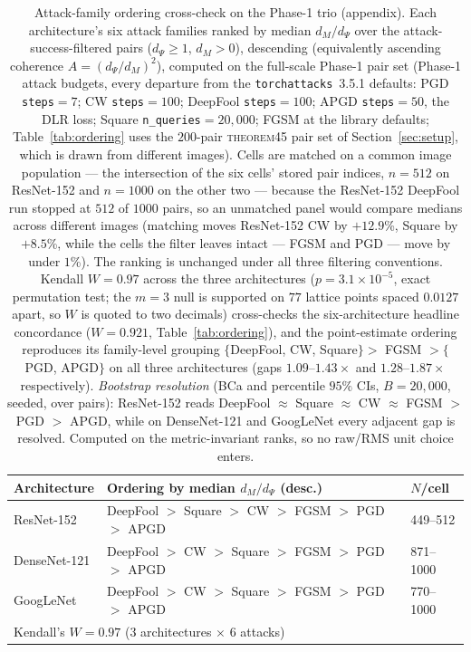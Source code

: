 \begin{table}[h]
\centering
\caption{Attack-family ordering cross-check on the Phase-1 trio (appendix). Each architecture's six attack families ranked by median $d_M/d_\Psi$ over the attack-success-filtered pairs ($d_\Psi\ge1$, $d_M>0$), descending (equivalently ascending coherence $A=(d_\Psi/d_M)^2$), computed on the full-scale Phase-1 pair set (Phase-1 attack budgets, every departure from the \texttt{torchattacks}~3.5.1 defaults: PGD \texttt{steps}$=7$; CW \texttt{steps}$=100$; DeepFool \texttt{steps}$=100$; APGD \texttt{steps}$=50$, the DLR loss; Square \texttt{n\_queries}$=20{,}000$; FGSM at the library defaults; Table~\ref{tab:ordering} uses the $200$-pair \textsc{theorem45} pair set of Section~\ref{sec:setup}, which is drawn from different images). Cells are matched on a common image population --- the intersection of the six cells' stored pair indices, $n=512$ on ResNet-152 and $n=1000$ on the other two --- because the ResNet-152 DeepFool run stopped at $512$ of $1000$ pairs, so an unmatched panel would compare medians across different images (matching moves ResNet-152 CW by $+12.9$\%, Square by $+8.5$\%, while the cells the filter leaves intact --- FGSM and PGD --- move by under $1$\%). The ranking is unchanged under all three filtering conventions. Kendall $W=0.97$ across the three architectures ($p=3.1\times10^{-5}$, exact permutation test; the $m=3$ null is supported on $77$ lattice points spaced $0.0127$ apart, so $W$ is quoted to two decimals) cross-checks the six-architecture headline concordance ($W=0.921$, Table~\ref{tab:ordering}), and the point-estimate ordering reproduces its family-level grouping $\{$DeepFool, CW, Square$\}>$ FGSM $>\{$PGD, APGD$\}$ on all three architectures (gaps $1.09$--$1.43\times$ and $1.28$--$1.87\times$ respectively). \emph{Bootstrap resolution} (BCa and percentile $95\%$ CIs, $B=20{,}000$, seeded, over pairs): ResNet-152 reads DeepFool $\approx$ Square $\approx$ CW $\approx$ FGSM $>$ PGD $>$ APGD, while on DenseNet-121 and GoogLeNet every adjacent gap is resolved. Computed on the metric-invariant ranks, so no raw/RMS unit choice enters.}
\label{tab:s3_ordering_panel}
\begin{tabular}{lll}
\toprule
Architecture & Ordering by median $d_M/d_\Psi$ (desc.) & $N$/cell \\
\midrule
ResNet-152   & DeepFool $>$ Square $>$ CW $>$ FGSM $>$ PGD $>$ APGD & 449--512 \\
DenseNet-121 & DeepFool $>$ CW $>$ Square $>$ FGSM $>$ PGD $>$ APGD & 871--1000 \\
GoogLeNet    & DeepFool $>$ CW $>$ Square $>$ FGSM $>$ PGD $>$ APGD & 770--1000 \\
\midrule
\multicolumn{3}{l}{Kendall's $W = 0.97$ (3 architectures $\times$ 6 attacks)} \\
\bottomrule
\end{tabular}
\end{table}
